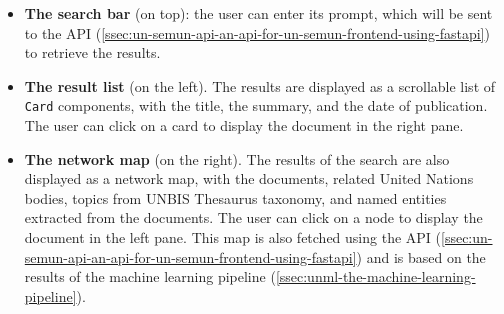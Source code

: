 \begin{itemize}
    \item \textbf{The search bar} (on top): the user can enter its prompt, which will be sent to the API (\ref{ssec:un-semun-api-an-api-for-un-semun-frontend-using-fastapi}) to retrieve the results.
    \item \textbf{The result list} (on the left). The results are displayed as a scrollable list of \texttt{Card} components, with the title, the summary, and the date of publication. The user can click on a card to display the document in the right pane.
    \item \textbf{The network map} (on the right). The results of the search are also displayed as a network map, with the documents, related United Nations bodies, topics from UNBIS Thesaurus taxonomy, and named entities extracted from the documents. The user can click on a node to display the document in the left pane. This map is also fetched using the API (\ref{ssec:un-semun-api-an-api-for-un-semun-frontend-using-fastapi}) and is based on the results of the machine learning pipeline (\ref{ssec:unml-the-machine-learning-pipeline}).
\end{itemize}


